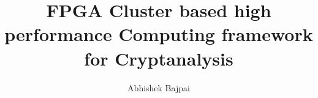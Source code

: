\documentclass[a4paper,11pt]{report}
\title{FPGA Cluster based high performance Computing framework for Cryptanalysis}
\author{Abhishek Bajpai}
\begin{document}
\maketitle
\tableofcontents

\begin{abstract}
\end{abstract}

\chapter{}
\end{document}
